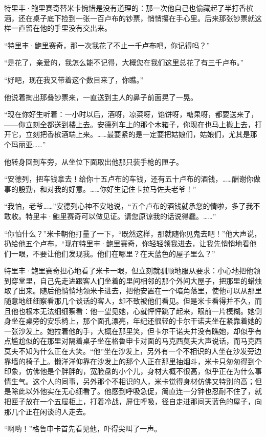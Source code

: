 \par 特里丰·鲍里赛奇替米卡惋惜是没有道理的：那一次他自己也偷藏起了半打香槟酒，还在桌子底下捡到一张一百卢布的钞票，悄悄攥在手心里。后来那张钞票就这样一直留在他的手里没有交出来。
\par “特里丰·鲍里赛奇，那一次我花了不止一千卢布吧，你记得吗？”
\par “是花了，亲爱的，我怎么能不记得，大概您在我们这里总花了有三千卢布。”
\par “好吧，现在我又带着这个数目来了，你瞧。”
\par 他说着掏出那叠钞票来，一直送到主人的鼻子前面晃了一晃。
\par “现在你好生听着：一小时以后，酒呀，凉菜呀，馅饼呀，糖果呀，都要送来了，——你立刻全都送到楼上去。安德列车上的那个木箱子，你现在也马上搬上去，打开它，立刻把香槟酒端上来。……最要紧的是一定要把姑娘们，姑娘们，尤其是那个玛丽亚……”
\par 他转身回到车旁，从坐位下面取出他那只装手枪的匣子。
\par “安德列，把车钱拿去！给你十五卢布的车钱，还有五十卢布的酒钱，……酬谢你做事的殷勤，和对我的好意。……你好生记住卡拉马佐夫老爷！”
\par “我怕，老爷……”安德列心神不安地说，“五个卢布的酒钱就承您的情啦，多了我不敢收。特里丰·鲍里赛奇可以做见证。请您原谅我的话说得蠢。……”
\par “你怕什么？”米卡朝他打量了一下，“既然这样，那就随你见鬼去吧！”他大声说，扔给他五个卢布，“现在特里丰·鲍里赛奇，你轻轻领我进去，让我先悄悄地看他们一眼，不要让他们发现我。他们在哪里？在天蓝色的屋子里么？”
\par 特里丰·鲍里赛奇担心地看了米卡一眼，但立刻就驯顺地服从要求：小心地把他领到穿堂里，自己先走进跟客人们坐着的里间相邻的那个外间大屋子，把那里的蜡烛取了出来。随后他悄悄地领米卡进去，把他安置在一个暗角落里，使他可以从那里随意地细细察看那几个谈话的客人，却不致被他们看见。但是米卡看得并不久，而且他也根本无法细细察看：他一望见她，心就怦怦跳了起来，眼前一片模糊。她侧身坐在桌旁的安乐椅上，那个面孔漂亮，年纪还很轻的卡尔干诺夫坐在紧靠着她的一张沙发上。她拉着他的手，大概在那里笑，但卡尔干诺夫并没有瞧她，却似乎有点尴尬似的在那里对隔着桌子坐在格鲁申卡对面的马克西莫夫大声说话，而马克西莫夫不知为什么正在大笑。“他”坐在沙发上，另外有一个不相识的人坐在沙发旁边靠墙的椅子上。懒洋洋仰靠在沙发上的那个人正在那里抽烟斗，米卡只匆匆得到个印象，仿佛他是个胖胖的，宽脸盘的小个儿，身材大概不很高，似乎正在为什么事情生气。这个人的同事，另外那个不相识的人，米卡觉得身材仿佛又特别的高；但是除此以外他实在无心细看了。他感到呼吸急促，简直连一分钟也忍耐不住了，就把匣子放在一个五屉柜上，打着冷战，屏住呼吸，径自走进那间天蓝色的屋子，向那几个正在闲谈的人走去。
\par “啊哟！”格鲁申卡首先看见他，吓得尖叫了一声。
